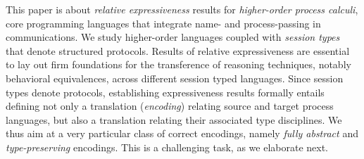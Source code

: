 \noi 
This paper is about \emph{relative expressiveness} results for 
\emph{higher-order process calculi}, core programming languages that 
integrate name- and process-passing in communications.
We study higher-order languages coupled with \emph{session types} that denote structured protocols. 
Results of relative expressiveness are essential to lay out firm foundations for the transference of reasoning techniques, notably behavioral equivalences, across different session typed languages.
Since session types denote protocols, 
 establishing expressiveness results formally entails defining 
 not only a translation (\emph{encoding})
relating source and target process languages, but also a translation 
relating their associated type disciplines. 
We thus aim at a very particular class of correct encodings, namely \emph{fully abstract} and \emph{type-preserving} encodings.
This is a challenging task, as we elaborate next.


